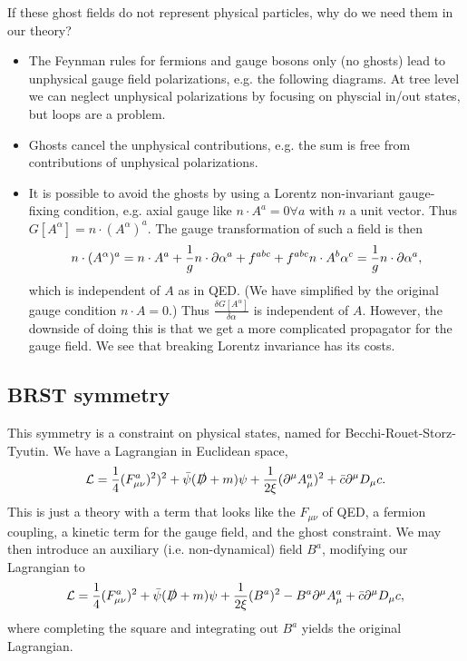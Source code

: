 If these ghost fields do not represent physical particles, why do we need them in our theory?
\begin{itemize}
    \item The Feynman rules for fermions and gauge bosons only (no ghosts) lead to unphysical gauge field polarizations, e.g. the following diagrams.
    At tree level we can neglect unphysical polarizations by focusing on physcial in/out states, but loops are a problem.
    \item Ghosts cancel the unphysical contributions, e.g. the sum
    is free from contributions of unphysical polarizations.
    \item It is possible to avoid the ghosts by using a Lorentz non-invariant gauge-fixing condition, e.g. axial gauge like $n\cdot A^a=0 \forall a$ with $n$ a unit vector. Thus $G[A^\alpha]=n\cdot (A^\alpha)^a$. The gauge transformation of such a field is then
    \begin{equation}
        n\cdot (A^\alpha)^a = n\cdot A^a +\frac{1}{g} n \cdot \partial \alpha^a +f^{abc} +f^{abc} n\cdot A^b \alpha^c =\frac{1}{g} n\cdot \partial \alpha^a,
    \end{equation}
    which is independent of $A$ as in QED. (We have simplified by the original gauge condition $n\cdot A=0$.)  Thus $\frac{\delta G[A^\alpha]}{\delta \alpha}$ is independent of $A$. However, the downside of doing this is that we get a more complicated propagator for the gauge field. We see that breaking Lorentz invariance has its costs.
\end{itemize}

\subsection*{BRST symmetry}
This symmetry is a constraint on physical states, named for Becchi-Rouet-Storz-Tyutin. We have a Lagrangian in Euclidean space,
\begin{equation}
    \mathcal L=\frac{1}{4}(F^a_{\mu\nu})^2)^2 +\bar \psi(\slashed{D}+m)\psi +\frac{1}{2\xi}(\partial^\mu A^a_\mu)^2 + \bar c \partial^\mu D_\mu c.
\end{equation}
This is just a theory with a term that looks like the $F_{\mu\nu}$ of QED, a fermion coupling, a kinetic term for the gauge field, and the ghost constraint.
We may then introduce an auxiliary (i.e. non-dynamical) field $B^a$, modifying our Lagrangian to
\begin{equation}
    \mathcal L = \frac{1}{4}(F_{\mu\nu}^a)^2 + \bar \psi(\slashed{D} + m) \psi +\frac{1}{2\xi} (B^a)^2 -B^a \partial^\mu A_\mu^a  +\bar c \partial^\mu D_\mu c,
\end{equation}
where completing the square and integrating out $B^a$ yields the original Lagrangian.

